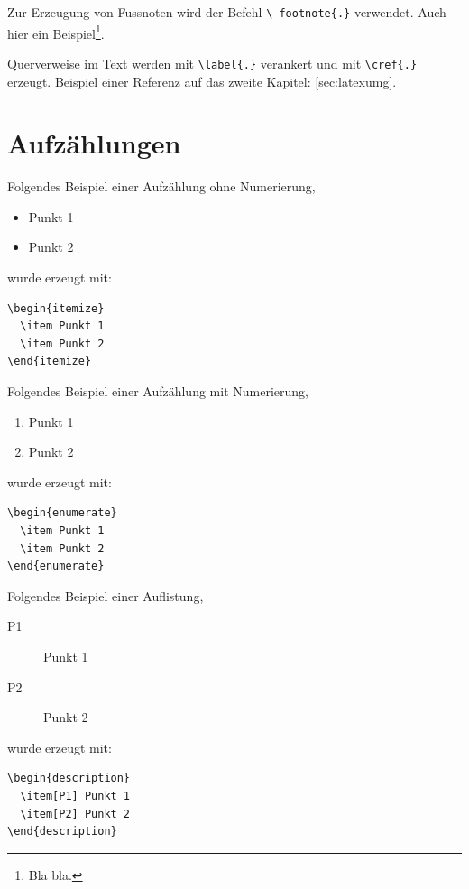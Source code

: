 Zur Erzeugung von Fussnoten wird der Befehl \texttt{\textbackslash
footnote\{.\}} verwendet. Auch hier ein Beispiel\footnote{Bla
bla.}.

Querverweise im Text werden mit \texttt{\textbackslash label\{.\}}
verankert und mit \texttt{\textbackslash cref\{.\}} erzeugt.
Beispiel einer Referenz auf das zweite Kapitel:
\cref{sec:latexumg}.


\section{Aufzählungen}\label{sec:aufz}

Folgendes Beispiel einer Aufzählung ohne Numerierung,
\begin{itemize}
  \item Punkt 1
  \item Punkt 2
\end{itemize}
wurde erzeugt mit:
\begin{verbatim}
\begin{itemize}
  \item Punkt 1
  \item Punkt 2
\end{itemize}
\end{verbatim}

Folgendes Beispiel einer Aufzählung mit Numerierung,
\begin{enumerate}
  \item Punkt 1
  \item Punkt 2
\end{enumerate}
wurde erzeugt mit:
\begin{verbatim}
\begin{enumerate}
  \item Punkt 1
  \item Punkt 2
\end{enumerate}
\end{verbatim}

Folgendes Beispiel einer Auflistung,
\begin{description}
  \item[P1] Punkt 1
  \item[P2] Punkt 2
\end{description}
wurde erzeugt mit:
\begin{verbatim}
\begin{description}
  \item[P1] Punkt 1
  \item[P2] Punkt 2
\end{description}
\end{verbatim}


